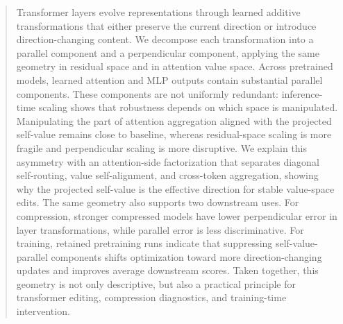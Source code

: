 \begin{abstract}
Transformer layers evolve representations through learned additive
transformations that either preserve the current direction or introduce
direction-changing content. We decompose each transformation into a parallel
component and a perpendicular component, applying the same geometry in
residual space and in attention value space. Across pretrained models, learned
attention and MLP outputs contain substantial parallel components. These
components are not uniformly redundant: inference-time scaling shows that
robustness depends on which space is manipulated. Manipulating the part of
attention aggregation aligned with the projected self-value remains close to
baseline, whereas residual-space scaling is more fragile and perpendicular
scaling is more disruptive. We explain this asymmetry with an attention-side
factorization that separates diagonal self-routing, value self-alignment, and
cross-token aggregation, showing why the projected self-value is the effective
direction for stable value-space edits. The same geometry also supports two
downstream uses. For compression, stronger compressed models have lower
perpendicular error in layer transformations, while parallel error is less
discriminative. For training, retained pretraining runs indicate that
suppressing self-value-parallel components shifts optimization toward more
direction-changing updates and improves average downstream scores. Taken
together, this geometry is not only descriptive, but also a practical
principle for transformer editing, compression diagnostics, and training-time
intervention.
\end{abstract}
